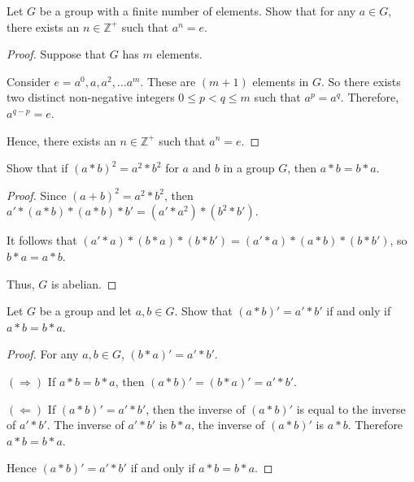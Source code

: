 \newpage
\begin{exercise}
    Let $G$ be a group with a finite number of elements. Show that for any $a\in G$, there exists an $n\in\mathbb{Z}^{+}$ such that $a^{n} = e$.
\end{exercise}

\begin{proof}
    Suppose that $G$ has $m$ elements.

    Consider $e = a^{0}, a, a^{2}, \ldots a^{m}$. These are $(m + 1)$ elements in $G$. So there exists two distinct non-negative integers $0\le p < q\le m$ such that $a^{p} = a^{q}$. Therefore, $a^{q-p} = e$.

    Hence, there exists an $n\in\mathbb{Z}^{+}$ such that $a^{n} = e$.
\end{proof}

\newpage
\begin{exercise}
    Show that if ${(a * b)}^{2} = a^{2} * b^{2}$ for $a$ and $b$ in a group $G$, then $a * b = b * a$.
\end{exercise}

\begin{proof}
    Since ${(a + b)}^{2} = a^{2} * b^{2}$, then $a' * (a * b) * (a * b) * b' = (a' * a^{2}) * (b^{2} * b')$.

    It follows that $(a' * a) * (b * a) * (b * b') = (a' * a) * (a * b) * (b * b')$, so $b * a = a * b$.

    Thus, $G$ is abelian.
\end{proof}

\newpage
\begin{exercise}
    Let $G$ be a group and let $a, b\in G$. Show that ${(a * b)}' = a' * b'$ if and only if $a * b = b * a$.
\end{exercise}

\begin{proof}
    For any $a, b\in G$, $(b * a)' = a' * b'$.

    $(\Rightarrow)$ If $a * b = b * a$, then $(a * b)' = (b * a)' = a' * b'$.

    $(\Leftarrow)$ If ${(a * b)}' = a' * b'$, then the inverse of ${(a * b)}'$ is equal to the inverse of $a' * b'$. The inverse of $a' * b'$ is $b * a$, the inverse of ${(a * b)}'$ is $a * b$. Therefore $a * b = b * a$.

    Hence ${(a * b)}' = a' * b'$ if and only if $a * b = b * a$.
\end{proof}

